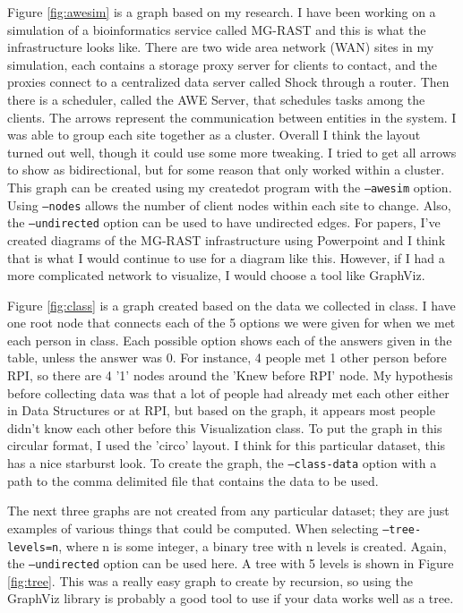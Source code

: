 \documentclass[11pt]{article}
\numberwithin{figure}{section}
\begin{document}
Figure \ref{fig:awesim} is a graph based on my research.  I have been working on a simulation of a bioinformatics service called MG-RAST and this is what the infrastructure looks like.  There are two wide area network (WAN) sites in my simulation, each contains a storage proxy server for clients to contact, and the proxies connect to a centralized data server called Shock through a router. Then there is a scheduler, called the AWE Server, that schedules tasks among the clients.  The arrows represent the communication between entities in the system.  I was able to group each site together as a cluster.  Overall I think the layout turned out well, though it could use some more tweaking.  I tried to get all arrows to show as bidirectional, but for some reason that only worked within a cluster.  This graph can be created using my createdot program with the \texttt{--awesim} option.  Using \texttt{--nodes} allows the number of client nodes within each site to change.  Also, the \texttt{--undirected} option can be used to have undirected edges.  For papers, I've created diagrams of the MG-RAST infrastructure using Powerpoint and I think that is what I would continue to use for a diagram like this.  However, if I had a more complicated network to visualize, I would choose a tool like GraphViz.  

Figure \ref{fig:class} is a graph created based on the data we collected in class.  I have one root node that connects each of the 5 options we were given for when we met each person in class.  Each possible option shows each of the answers given in the table, unless the answer was 0.  For instance, 4 people met 1 other person before RPI, so there are 4 '1' nodes around the 'Knew before RPI' node.  My hypothesis before collecting data was that a lot of people had already met each other either in Data Structures or at RPI, but based on the graph, it appears most people didn't know each other before this Visualization class.  To put the graph in this circular format, I used the 'circo' layout.  I think for this particular dataset, this has a nice starburst look. To create the graph, the \texttt{--class-data} option with a path to the comma delimited file that contains the data to be used.

The next three graphs are not created from any particular dataset; they are just examples of various things that could be computed.  When selecting \texttt{--tree-levels=n}, where n is some integer, a binary tree with n levels is created.  Again, the \texttt{--undirected} option can be used here.  A tree with 5 levels is shown in Figure \ref{fig:tree}.  This was a really easy graph to create by recursion, so using the GraphViz library is probably a good tool to use if your data works well as a tree.
\end{document}
